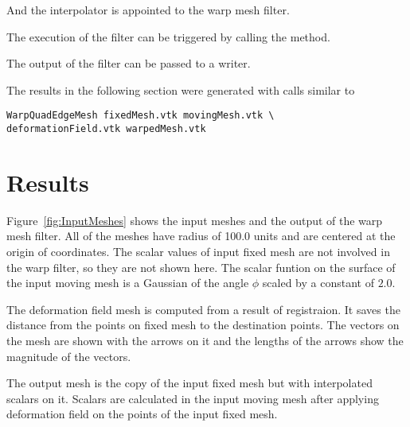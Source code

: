 \documentclass{InsightArticle}
\begin{document}
And the interpolator is appointed to the warp mesh filter.

\begin{center}

\end{center}

The execution of the filter can be triggered by calling the  method.

\begin{center}

\end{center}

The output of the filter can be passed to a writer. 

\begin{center}

\end{center}

The results in the following section were generated with calls similar to

\begin{verbatim}
WarpQuadEdgeMesh fixedMesh.vtk movingMesh.vtk \
deformationField.vtk warpedMesh.vtk 
\end{verbatim}


\section{Results}

Figure~\ref{fig:InputMeshes} shows the input meshes and the output of the warp mesh filter.
All of the meshes have radius of 100.0 units and are centered at the origin of coordinates.
The scalar values of input fixed mesh are not involved in the warp filter, so they are not 
shown here. The scalar funtion on the surface of the input moving
mesh is a Gaussian of the angle $\phi$ scaled by a constant of $2.0$.

The deformation field mesh is computed from a result of registraion. It saves the distance 
from the points on fixed mesh to the destination points. The vectors on the mesh are shown
with the arrows on it and the lengths of the arrows show the magnitude of the vectors.

The output mesh is the copy of the input fixed mesh but with interpolated scalars on it.
Scalars are calculated in the input moving mesh after applying deformation field on the points 
of the input fixed mesh.
\end{document}
